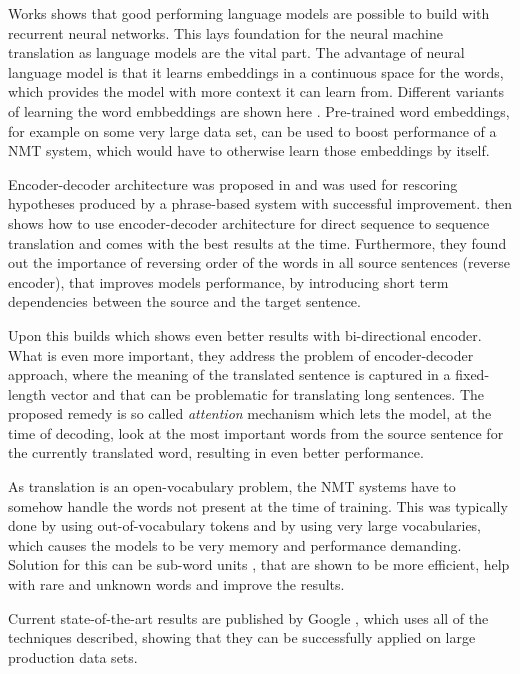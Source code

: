 \documentclass{ExcelAtFIT}
\begin{document}
Works \cite{neuralLanguageModels, neuralLanguageModels2, mikolovphd} shows that good performing language models are possible to build with recurrent neural networks. This lays foundation for the neural machine translation as language models are the vital part. The advantage of neural language model is that it learns embeddings in a continuous space for the words, which provides the model with more context it can learn from. Different variants of learning the word embbeddings are shown here \cite{word2vec,kingQueen,glove,fasttext}. Pre-trained word  embeddings, for example on some very large data set, can be used to boost performance of a NMT system, which would have to otherwise learn those embeddings by itself.

Encoder-decoder architecture was proposed in \cite{encoderDecoder} and was used for rescoring hypotheses produced by a phrase-based system with successful improvement. \cite{seq2seq} then shows how to use encoder-decoder architecture for direct sequence to sequence translation and comes with the best results at the time. Furthermore, they found out the importance of reversing order of the words  in all source sentences (reverse encoder), that improves models performance, by introducing short term dependencies between the source and the target sentence.

Upon this builds \cite{attention} which shows even better results with bi-directional encoder. What is even more important, they address the problem of encoder-decoder approach, where the meaning of the translated sentence is captured in a fixed-length vector and that can be problematic for translating long sentences. The proposed remedy is so called \emph{attention} mechanism which lets the model, at the time of decoding, look at the most important words from the source sentence for the currently translated word, resulting in even better performance.

As translation is an open-vocabulary problem, the NMT systems have to somehow handle the words not present at the time of training. This was typically done by using out-of-vocabulary tokens and by using very large vocabularies, which causes the models to be very memory and performance demanding. Solution for this can be sub-word units \cite{mikolovSubwords, subwords}, that are shown to be more efficient, help with rare and unknown words and improve the results.

Current state-of-the-art results are published by Google \cite{googleBridgingGap,googleAttention}, which uses all of the techniques described, showing that they can be successfully applied on large production data sets.
\end{document}
